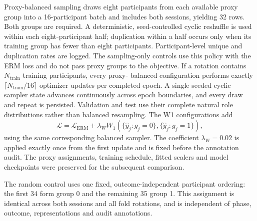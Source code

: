 Proxy-balanced sampling draws eight participants from each available proxy group into a
16-participant batch and includes both sessions, yielding 32 rows. Both groups are required. A
deterministic, seed-controlled cyclic reshuffle is used within each
eight-participant half; duplication within a half occurs only when its training group has fewer
than eight participants. Participant-level unique and duplication rates are logged. The
sampling-only controls use this policy with the ERM loss and do not pass proxy groups to the
objective. If a rotation contains $N_{\mathrm{train}}$ training participants, every proxy-
balanced configuration performs exactly $\lceil N_{\mathrm{train}}/16\rceil$ optimizer updates
per completed epoch. A single seeded cyclic sampler state advances continuously across epoch
boundaries, and every draw and repeat is persisted. Validation and test use their complete natural
role distributions rather than balanced resampling. The
W1 configurations add
\begin{equation}
    \mathcal{L}=\mathcal{L}_{\mathrm{ERM}}+\lambda_W
    W_1\!\left(\{\hat y_j:g_j=0\},\{\hat y_j:g_j=1\}\right),
\end{equation}
using the same corresponding balanced sampler. The coefficient $\lambda_W=0.02$ is applied exactly
once from the first update and is fixed before the annotation audit. The proxy assignments,
training schedule, fitted scalers and model checkpoints were preserved for the subsequent
comparison.

The random control uses one fixed, outcome-independent participant ordering: the first 34 form
group 0 and the remaining 35 group 1. This assignment is
identical across both sessions and all fold rotations, and is independent of phase, outcome,
representations and audit annotations.

